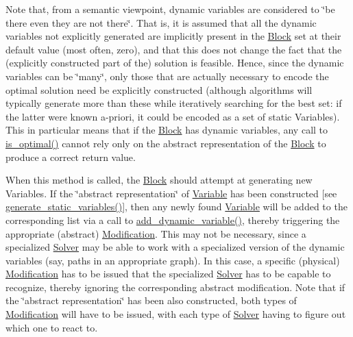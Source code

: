 Note that, from a semantic viewpoint, dynamic variables are considered to \char`\"{}be there even they are not there\char`\"{}. That is, it is assumed that all the dynamic variables not explicitly generated are implicitly present in the \mbox{\hyperlink{class_s_m_spp__di__unipi__it_1_1_block}{Block}} set at their default value (most often, zero), and that this does not change the fact that the (explicitly constructed part of the) solution is feasible. Hence, since the dynamic variables can be \char`\"{}many\char`\"{}, only those that are actually necessary to encode the optimal solution need be explicitly constructed (although algorithms will typically generate more than these while iteratively searching for the best set\+: if the latter were known a-\/priori, it could be encoded as a set of static Variables). This in particular means that if the \mbox{\hyperlink{class_s_m_spp__di__unipi__it_1_1_block}{Block}} has dynamic variables, any call to \mbox{\hyperlink{class_s_m_spp__di__unipi__it_1_1_block_a44ef42401ecae613574f3df619480de1}{is\+\_\+optimal()}} cannot rely only on the abstract representation of the \mbox{\hyperlink{class_s_m_spp__di__unipi__it_1_1_block}{Block}} to produce a correct return value.

When this method is called, the \mbox{\hyperlink{class_s_m_spp__di__unipi__it_1_1_block}{Block}} should attempt at generating new Variables. If the \char`\"{}abstract representation\char`\"{} of \mbox{\hyperlink{class_s_m_spp__di__unipi__it_1_1_variable}{Variable}} has been constructed \mbox{[}see \mbox{\hyperlink{class_s_m_spp__di__unipi__it_1_1_block_acd79fd0980af547f2f06241cb989094e}{generate\+\_\+static\+\_\+variables()}}\mbox{]}, then any newly found \mbox{\hyperlink{class_s_m_spp__di__unipi__it_1_1_variable}{Variable}} will be added to the corresponding list via a call to \mbox{\hyperlink{class_s_m_spp__di__unipi__it_1_1_block_af7677194bbf8a194cf2105e72a1be2e7}{add\+\_\+dynamic\+\_\+variable()}}, thereby triggering the appropriate (abstract) \mbox{\hyperlink{class_s_m_spp__di__unipi__it_1_1_modification}{Modification}}. This may not be necessary, since a specialized \mbox{\hyperlink{class_s_m_spp__di__unipi__it_1_1_solver}{Solver}} may be able to work with a specialized version of the dynamic variables (say, paths in an appropriate graph). In this case, a specific (physical) \mbox{\hyperlink{class_s_m_spp__di__unipi__it_1_1_modification}{Modification}} has to be issued that the specialized \mbox{\hyperlink{class_s_m_spp__di__unipi__it_1_1_solver}{Solver}} has to be capable to recognize, thereby ignoring the corresponding abstract modification. Note that if the \char`\"{}abstract representation\char`\"{} has been also constructed, both types of \mbox{\hyperlink{class_s_m_spp__di__unipi__it_1_1_modification}{Modification}} will have to be issued, with each type of \mbox{\hyperlink{class_s_m_spp__di__unipi__it_1_1_solver}{Solver}} having to figure out which one to react to.

